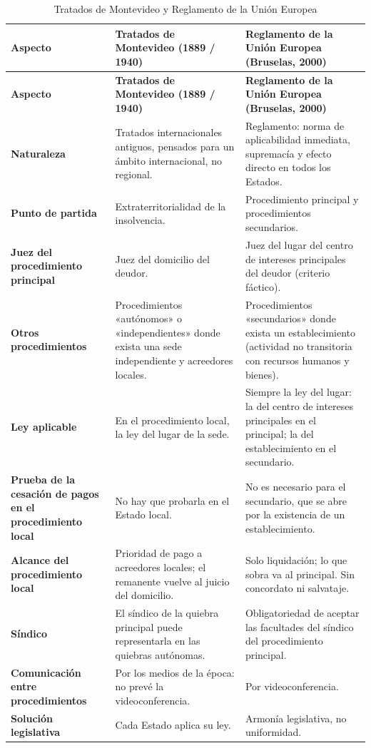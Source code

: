\documentclass[12pt,oneside]{book}
\begin{document}
\begin{longtable}{>{\raggedright\arraybackslash}p{} >{\raggedright\arraybackslash}p{} >{\raggedright\arraybackslash}p{}}
\caption{Tratados de Montevideo y Reglamento de la Unión Europea}\\
\toprule
\textbf{Aspecto} & \textbf{Tratados de Montevideo (1889 / 1940)} & \textbf{Reglamento de la Unión Europea (Bruselas, 2000)} \\
\midrule
\endfirsthead
\toprule
\textbf{Aspecto} & \textbf{Tratados de Montevideo (1889 / 1940)} & \textbf{Reglamento de la Unión Europea (Bruselas, 2000)} \\
\midrule
\endhead
\bottomrule
\endlastfoot
\textbf{Naturaleza} & Tratados internacionales antiguos, pensados para un ámbito internacional, no regional. & Reglamento: norma de aplicabilidad inmediata, supremacía y efecto directo en todos los Estados. \\
\textbf{Punto de partida} & Extraterritorialidad de la insolvencia. & Procedimiento principal y procedimientos secundarios. \\
\textbf{Juez del procedimiento principal} & Juez del domicilio del deudor. & Juez del lugar del centro de intereses principales del deudor (criterio fáctico). \\
\textbf{Otros procedimientos} & Procedimientos «autónomos» o «independientes» donde exista una sede independiente y acreedores locales. & Procedimientos «secundarios» donde exista un establecimiento (actividad no transitoria con recursos humanos y bienes). \\
\textbf{Ley aplicable} & En el procedimiento local, la ley del lugar de la sede. & Siempre la ley del lugar: la del centro de intereses principales en el principal; la del establecimiento en el secundario. \\
\textbf{Prueba de la cesación de pagos en el procedimiento local} & No hay que probarla en el Estado local. & No es necesario para el secundario, que se abre por la existencia de un establecimiento. \\
\textbf{Alcance del procedimiento local} & Prioridad de pago a acreedores locales; el remanente vuelve al juicio del domicilio. & Solo liquidación; lo que sobra va al principal. Sin concordato ni salvataje. \\
\textbf{Síndico} & El síndico de la quiebra principal puede representarla en las quiebras autónomas. & Obligatoriedad de aceptar las facultades del síndico del procedimiento principal. \\
\textbf{Comunicación entre procedimientos} & Por los medios de la época: no prevé la videoconferencia. & Por videoconferencia. \\
\textbf{Solución legislativa} & Cada Estado aplica su ley. & Armonía legislativa, no uniformidad. \\
\end{longtable}
\end{document}
